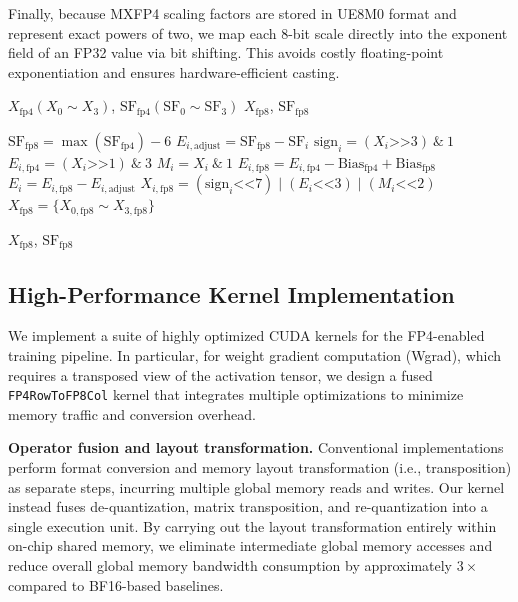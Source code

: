 Finally, because MXFP4 scaling factors are stored in UE8M0 format and represent exact powers of two, we map each 8-bit scale directly into the exponent field of an FP32 value via bit shifting. This avoids costly floating-point exponentiation and ensures hardware-efficient casting.


\begin{algorithm}[!hbtp]
    \caption{Direct FP4-to-FP8 Conversion Algorithm}
    \label{alg:DirectConversion}
    \renewcommand{\algorithmicrequire}{\textbf{Input:}}
    \renewcommand{\algorithmicensure}{\textbf{Output:}}
    
    \begin{algorithmic}[1]
        \REQUIRE $X_{\text{fp4}} (X_0 \sim X_3)$, $\mathrm{SF}_{\text{fp4}} (\mathrm{SF}_0 \sim \mathrm{SF}_3)$
        \ENSURE $X_{\text{fp8}}$, $\mathrm{SF}_{\text{fp8}}$
        
        \STATE $\mathrm{SF}_{\text{fp8}} = \max(\mathrm{SF}_{\text{fp4}}) - 6$
        \STATE $E_{i,\text{adjust}} = \mathrm{SF}_{\text{fp8}} - \mathrm{SF}_i$
        \STATE $\text{sign}_i = (X_i \texttt{>>} 3) \ \&\ 1$
        \STATE $E_{i,\text{fp4}} = (X_i \texttt{>>} 1) \ \&\ 3$
        \STATE $M_i = X_i \ \&\ 1$
        \STATE $E_{i,\text{fp8}} = E_{i,\text{fp4}} - \mathrm{Bias}_{\text{fp4}} + \mathrm{Bias}_{\text{fp8}}$
        \STATE $E_i = E_{i,\text{fp8}} - E_{i,\text{adjust}}$
        \STATE $X_{i,\text{fp8}} = (\text{sign}_i \texttt{<<} 7) \mid (E_i \texttt{<<} 3) \mid (M_i \texttt{<<} 2)$
        \STATE $X_{\text{fp8}} = \{X_{0,\text{fp8}} \sim X_{3,\text{fp8}}\}$
        
        \RETURN $X_{\text{fp8}}$, $\mathrm{SF}_{\text{fp8}}$
    \end{algorithmic}
\end{algorithm}

\subsection{High-Performance Kernel Implementation}

We implement a suite of highly optimized CUDA kernels for the FP4-enabled training pipeline. In particular, for weight gradient computation (Wgrad), which requires a transposed view of the activation tensor, we design a fused \texttt{FP4RowToFP8Col} kernel that integrates multiple optimizations to minimize memory traffic and conversion overhead.

\textbf{Operator fusion and layout transformation.}
Conventional implementations perform format conversion and memory layout transformation (i.e., transposition) as separate steps, incurring multiple global memory reads and writes. Our kernel instead fuses de-quantization, matrix transposition, and re-quantization into a single execution unit. By carrying out the layout transformation entirely within on-chip shared memory, we eliminate intermediate global memory accesses and reduce overall global memory bandwidth consumption by approximately $3\times$ compared to BF16-based baselines.

